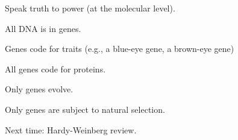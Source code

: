 \documentclass[t,handout]{beamer}  %
\begin{document}
\begin{frame}{Speak truth to power (at the molecular level).}

\vspace{-\baselineskip}

\hangpara All DNA is in genes. 

\pause

\hangpara Genes code for traits (e.g., a blue-eye gene, a brown-eye gene) 

\pause

\hangpara All genes code for proteins. 

\pause

\hangpara Only genes evolve. 

\pause

\hangpara Only genes are subject to natural selection. 

\end{frame}

\begin{frame}[t]{Next time: Hardy-Weinberg review.}


\end{frame}
\end{document}
